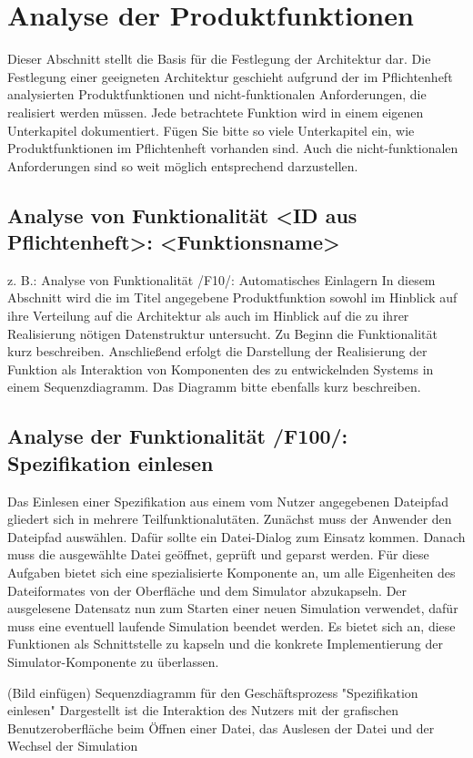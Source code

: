 \chapter{Analyse der Produktfunktionen}

Dieser Abschnitt stellt die Basis für die Festlegung der Architektur dar. Die
Festlegung einer geeigneten Architektur geschieht aufgrund der im Pflichtenheft
analysierten Produktfunktionen und nicht-funktionalen Anforderungen, die
realisiert werden müssen. Jede betrachtete Funktion wird in einem eigenen
Unterkapitel dokumentiert.  Fügen Sie bitte so viele Unterkapitel ein, wie
Produktfunktionen im Pflichtenheft vorhanden sind. Auch die nicht-funktionalen
Anforderungen sind so weit möglich entsprechend darzustellen.


\section{Analyse von Funktionalität <ID aus Pflichtenheft>: <Funktionsname>}
z. B.: Analyse von Funktionalität /F10/: Automatisches Einlagern
In diesem Abschnitt wird die im Titel angegebene Produktfunktion sowohl im
Hinblick auf ihre Verteilung auf die Architektur als auch im Hinblick auf die
zu ihrer Realisierung nötigen Datenstruktur untersucht.  Zu Beginn die
Funktionalität kurz beschreiben.  Anschließend erfolgt die Darstellung der
Realisierung der Funktion als Interaktion von Komponenten des zu entwickelnden
Systems in einem Sequenzdiagramm. Das Diagramm bitte ebenfalls kurz
beschreiben.

\section{Analyse der Funktionalität /F100/: Spezifikation einlesen}
Das Einlesen einer Spezifikation aus einem vom Nutzer angegebenen Dateipfad
gliedert sich in mehrere Teilfunktionalutäten. Zunächst muss der Anwender den
Dateipfad auswählen. Dafür sollte ein Datei-Dialog zum Einsatz kommen.
Danach muss die ausgewählte Datei geöffnet, geprüft und geparst werden. Für
diese Aufgaben bietet sich eine spezialisierte Komponente an, um alle
Eigenheiten des Dateiformates von der Oberfläche und dem Simulator abzukapseln.
Der ausgelesene Datensatz nun zum Starten einer neuen Simulation verwendet,
dafür muss eine eventuell laufende Simulation beendet werden. Es bietet sich
an, diese Funktionen als Schnittstelle zu kapseln und die konkrete Implementierung
der Simulator-Komponente zu überlassen.

(Bild einfügen)
Sequenzdiagramm für den Geschäftsprozess "Spezifikation einlesen"
Dargestellt ist die Interaktion des Nutzers mit der grafischen Benutzeroberfläche
beim Öffnen einer Datei, das Auslesen der Datei und der Wechsel der Simulation
